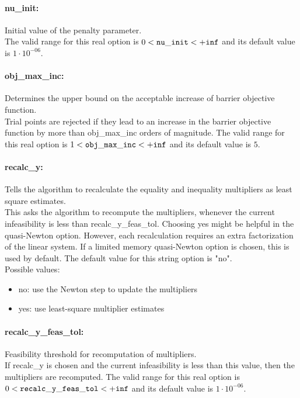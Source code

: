 \paragraph{nu\_init:}\label{sec:nu_init} Initial value of the penalty parameter. $\;$ \\
 The valid range for this real option is 
$0 <  {\tt nu\_init } <  {\tt +inf}$
and its default value is $1 \cdot 10^{-06}$.


\paragraph{obj\_max\_inc:}\label{sec:obj_max_inc} Determines the upper bound on the acceptable increase of barrier objective function. $\;$ \\
 Trial points are rejected if they lead to an
increase in the barrier objective function by
more than obj\_max\_inc orders of magnitude. The valid range for this real option is 
$1 <  {\tt obj\_max\_inc } <  {\tt +inf}$
and its default value is $5$.


\paragraph{recalc\_y:}\label{sec:recalc_y} Tells the algorithm to recalculate the equality and inequality multipliers as least square estimates. $\;$ \\
 This asks the algorithm to recompute the
multipliers, whenever the current infeasibility
is less than recalc\_y\_feas\_tol. Choosing yes
might be helpful in the quasi-Newton option. 
However, each recalculation requires an extra
factorization of the linear system.  If a limited
memory quasi-Newton option is chosen, this is
used by default.
The default value for this string option is "no".
\\ 
Possible values:
\begin{itemize}
   \item no: use the Newton step to update the multipliers
   \item yes: use least-square multiplier estimates
\end{itemize}

\paragraph{recalc\_y\_feas\_tol:}\label{sec:recalc_y_feas_tol} Feasibility threshold for recomputation of multipliers. $\;$ \\
 If recalc\_y is chosen and the current
infeasibility is less than this value, then the
multipliers are recomputed. The valid range for this real option is 
$0 <  {\tt recalc\_y\_feas\_tol } <  {\tt +inf}$
and its default value is $1 \cdot 10^{-06}$.


